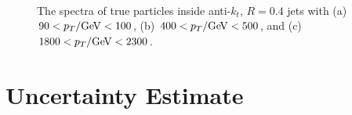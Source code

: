 \begin{figure}[ht]
\centering
{}
\\
\caption{The spectra of true particles inside anti-$k_t$, $R=0.4$ jets with (a) $90<\pt/\GeV<100$, (b) $400<\pt/\GeV<500$, and (c) $1800<\pt/\GeV<2300$.}
\label{fig:particle_spectra}
\end{figure}

\section{Uncertainty Estimate}

